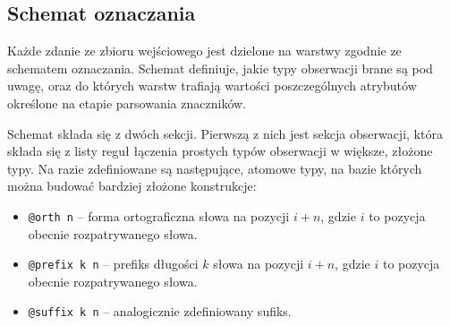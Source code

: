 \documentclass[a4paper,10]{article}
\begin{document}
\subsection{Schemat oznaczania}\label{sec:schema_def}

Każde zdanie ze zbioru wejściowego jest dzielone na warstwy
zgodnie ze schematem oznaczania. Schemat definiuje, jakie
typy obserwacji brane są pod uwagę, oraz do których
warstw trafiają wartości poszczególnych atrybutów określone na
etapie parsowania znaczników.

Schemat składa się z dwóch sekcji. Pierwszą z nich jest sekcja obserwacji,
która składa się z listy reguł łączenia prostych typów obserwacji
w większe, złożone typy.
Na razie zdefiniowane są następujące, atomowe typy, na bazie których
można budować bardziej złożone konstrukcje:
\begin{itemize}
\item \verb|@orth n| -- forma ortograficzna słowa na pozycji $i + n$,
gdzie $i$ to pozycja obecnie rozpatrywanego słowa.
\item \verb|@prefix k n| -- prefiks długości $k$ słowa na pozycji $i + n$,
gdzie $i$ to pozycja obecnie rozpatrywanego słowa.
\item \verb|@suffix k n| -- analogicznie zdefiniowany sufiks.
\end{itemize}
\end{document}
